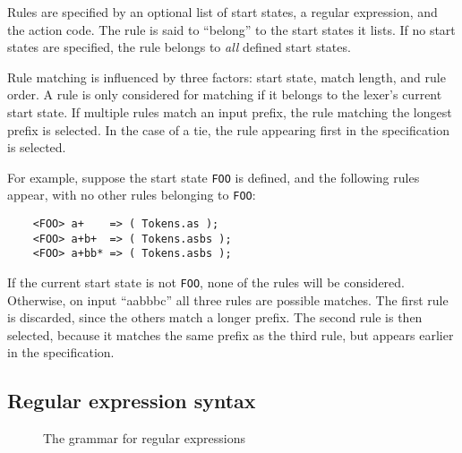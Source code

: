 Rules are specified by an optional list of start states, a regular expression, and the action code.  The rule is said to ``belong'' to the start states it lists.  If no start states are specified, the rule belongs to \emph{all} defined start states.

Rule matching is influenced by three factors: start state, match length, and rule order.  A rule is only considered for matching if it belongs to the lexer's current start state.  If multiple rules match an input prefix, the rule matching the longest prefix is selected.  In the case of a tie, the rule appearing first in the specification is selected.

For example, suppose the start state {\tt FOO} is defined, and the following rules appear, with no other rules belonging to {\tt FOO}:
\begin{verbatim}
    <FOO> a+    => ( Tokens.as );
    <FOO> a+b+  => ( Tokens.asbs );
    <FOO> a+bb* => ( Tokens.asbs );
\end{verbatim}
If the current start state is not {\tt FOO}, none of the rules will be considered.  Otherwise, on input ``aabbbc'' all three rules are possible matches.  The first rule is discarded, since the others match a longer prefix.  The second rule is then selected, because it matches the same prefix as the third rule, but appears earlier in the specification.

\subsection{Regular expression syntax}

\begin{figure}
\caption{The \ulex{} grammar for regular expressions}\label{ulex-rule-syntax}
\end{figure}

